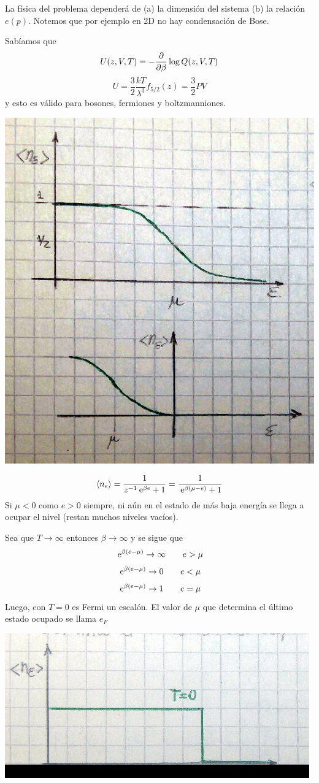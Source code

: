 \documentclass[10pt,oneside]{CBFT_book}
\begin{document}
La física del problema dependerá de (a) la dimensión del sistema (b) la relación $e(p)$. Notemos que por ejemplo
en 2D no hay condensación de Bose.

Sabíamos que 
\[
	U(z,V,T) = - \frac{\partial^{\hspace{-0.05em}} {}}{\partial {\beta}^{\hspace{-0.05em}}}\log Q(z,V,T)
\]
\[
	U = \frac{3}{2} \frac{kT}{\lambda^3} f_{5/2}(z) = \frac{3}{2} PV
\]
y esto es válido para bosones, fermiones y boltzmanniones.

\includegraphics[scale=0.5]{images/1625624007.jpg}

\[
	\braket{n_e} = \frac{1}{z^{-1} \:\mathrm{e}^{\beta e} + 1 } = \frac{1}{ \:\mathrm{e}^{\beta ( \mu - e) } + 1 }
\]
Si $ \mu < 0 $ como $ e > 0 $ siempre, ni aún en el estado de más baja energía se llega a ocupar el
nivel (restan muchos niveles vacíos).

Sea que $ T \to \infty $ entonces $ \beta \to \infty $ y se sigue que 
\[
	\:\mathrm{e}^{\beta(e-\mu)} \to \infty \qquad e> \mu
\]
\[
	\:\mathrm{e}^{\beta(e-\mu)} \to 0 \qquad  e< \mu
\]
\[
	\:\mathrm{e}^{\beta(e-\mu)} \to 1 \qquad  e = \mu
\]
Luego, con $ T = 0 $ es Fermi un escalón. El valor de $ \mu $ que determina el último
estado ocupado se llama $ e_F$ 


\includegraphics[scale=0.5]{images/1625624033.jpg}
\end{document}

